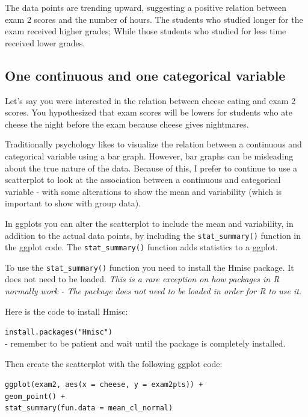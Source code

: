 \documentclass[
]{book}
\begin{document}
The data points are trending upward, suggesting a positive relation between exam 2 scores and the number of hours. The students who studied longer for the exam received higher grades; While those students who studied for less time received lower grades.

\hypertarget{one-continuous-and-one-categorical-variable}{%
\subsection{One continuous and one categorical variable}\label{one-continuous-and-one-categorical-variable}}

Let's say you were interested in the relation between cheese eating and exam 2 scores. You hypothesized that exam scores will be lowers for students who ate cheese the night before the exam because cheese gives nightmares.

Traditionally psychology likes to visualize the relation between a continuous and categorical variable using a bar graph. However, bar graphs can be misleading about the true nature of the data. Because of this, I prefer to continue to use a scatterplot to look at the association between a continuous and categorical variable - with some alterations to show the mean and variability (which is important to show with group data).

In ggplots you can alter the scatterplot to include the mean and variability, in addition to the actual data points, by including the \texttt{stat\_summary()} function in the ggplot code. The \texttt{stat\_summary()} function adds statistics to a ggplot.

To use the \texttt{stat\_summary()} function you need to install the Hmisc package. It does not need to be loaded. \emph{This is a rare exception on how packages in R normally work - The package does not need to be loaded in order for R to use it.}

Here is the code to install Hmisc:

\texttt{install.packages("Hmisc")}\\
- remember to be patient and wait until the package is completely installed.

Then create the scatterplot with the following ggplot code:

\texttt{ggplot(exam2,\ aes(x\ =\ cheese,\ y\ =\ exam2pts))\ +}\\
\texttt{geom\_point()\ +}~\\
\texttt{stat\_summary(fun.data\ =\ mean\_cl\_normal)}
\end{document}
